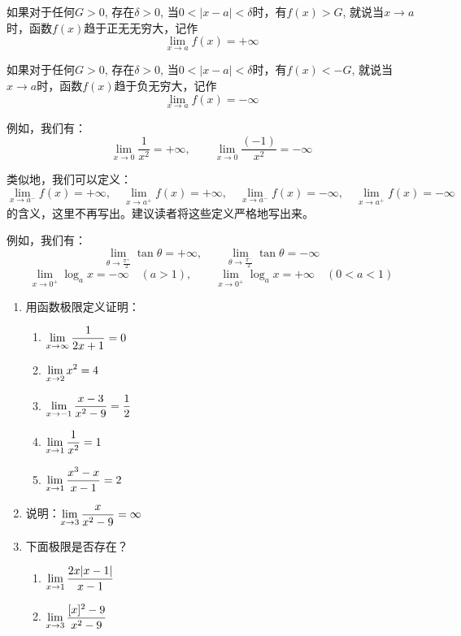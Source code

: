 如果对于任何$G>0$, 存在$\delta>0$, 当$0<|x-a|<\delta$时，有$f(x)>G$, 就说当$x\to a$时，函数$f(x)$趋于正无无穷大，记作
\[\lim_{x\to a}f(x)=+\infty\]

如果对于任何$G>0$, 存在$\delta>0$, 当$0<|x-a|<\delta$时，有$f(x)<-G$, 就说当$x\to a$时，函数$f(x)$趋于负无穷大，记作
\[\lim_{x\to a}f(x)=-\infty\]

例如，我们有：
\[\lim_{x\to 0}\frac{1}{x^2}=+\infty,\qquad \lim_{x\to 0}\frac{(-1)}{x^2}=-\infty\]

类似地，我们可以定义：
\[\lim_{x\to a^-}f(x)=+\infty,\quad \lim_{x\to a^+}f(x)=+\infty,\quad \lim_{x\to a^-}f(x)=-\infty,\quad \lim_{x\to a^+}f(x)=-\infty\]
的含义，这里不再写出。建议读者将这些定义严格地写出来。

例如，我们有：
\[\lim_{\theta\to \tfrac{\pi^+}{2}}\tan\theta =+\infty,\qquad \lim_{\theta\to \tfrac{\pi^-}{2}}\tan\theta =-\infty\]
\[\lim_{x\to 0^+}\log_a x =-\infty\quad (a>1),\qquad \lim_{x\to 0^+}\log_a x =+\infty\quad (0<a<1)\]

\begin{ex}
\begin{enumerate}
    \item 用函数极限定义证明：
    \begin{multicols}{2}
        \begin{enumerate}
            \item $\displaystyle\lim_{x\to \infty}\dfrac{1}{2x+1}=0$
            \item $\displaystyle\lim_{x\to 2}x^2=4$
            \item $\displaystyle\lim_{x\to -1}\dfrac{x-3}{x^2-9}=\dfrac{1}{2}$
            \item $\displaystyle\lim_{x\to 1}\dfrac{1}{x^2}=1$
            \item $\displaystyle\lim_{x\to 1}\dfrac{x^3-x}{x-1}=2$
        \end{enumerate}
    \end{multicols}
    \item 说明：$\displaystyle\lim_{x\to 3}\dfrac{x}{x^2-9}=\infty$
    \item 下面极限是否存在？
\begin{multicols}{2}
    \begin{enumerate}
        \item $\displaystyle\lim_{x\to 1}\dfrac{2x|x-1|}{x-1}$
        \item $\displaystyle\lim_{x\to 3}\dfrac{[x]^2-9}{x^2-9}$
    \end{enumerate}
\end{multicols}
\end{enumerate}
\end{ex}

